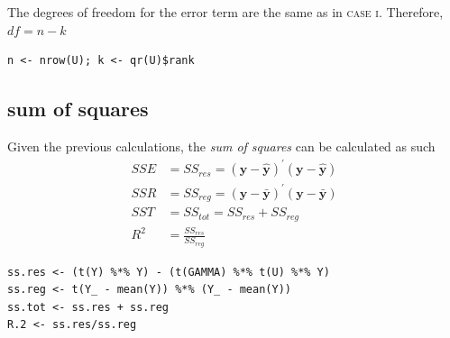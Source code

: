 \documentclass[10pt, twoside, openleft]{article}
\newcommand{\yhat}{\hat{y}} %
\newcommand{\ybar}{\bar{y}} %
\begin{document}
\noindent
The degrees of freedom for the error term are the same as in \textsc{case i}. Therefore, $df = n - k$
\smallskip

\begin{verbatim}
n <- nrow(U); k <- qr(U)$rank
\end{verbatim}

\begin{center}
\subsection{sum of squares}
\vspace{-3ex}
\end{center}

\noindent
Given the previous calculations, the \emph{sum of squares} can be calculated as such
\begin{equation*}
\begin{aligned}
SSE & = SS_{res} = \left( \mathbf{y} - \mathbf{\yhat} \right)^{'} \left( \mathbf{y} -
\mathbf{\yhat} \right) \\
SSR & = SS_{reg} = \left( \mathbf{y} - \mathbf{\ybar} \right)^{'} \left( \mathbf{y} -
\mathbf{\ybar} \right) \\
SST & = SS_{tot} = SS_{res} + SS_{reg} \\
R^{2} & = \frac{ SS_{res} }{ SS_{reg} } 
\end{aligned}
\end{equation*}
\smallskip

\begin{verbatim}
ss.res <- (t(Y) %*% Y) - (t(GAMMA) %*% t(U) %*% Y)
ss.reg <- t(Y_ - mean(Y)) %*% (Y_ - mean(Y))
ss.tot <- ss.res + ss.reg
R.2 <- ss.res/ss.reg
\end{verbatim}
\end{document}
